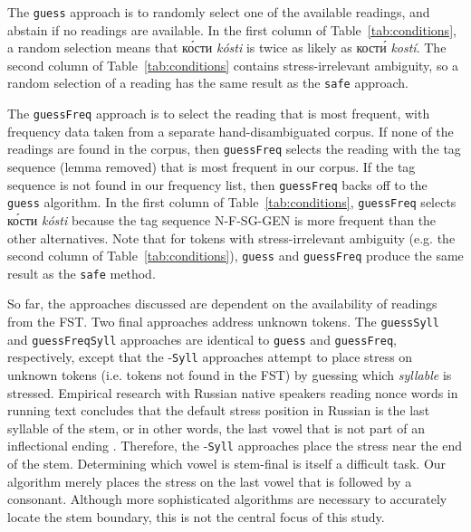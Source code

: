 \documentclass[11pt]{article}
\newcommand{\rus}[1]{\foreignlanguage{russian}{#1}}
\begin{document}
The {\small {\tt guess}} approach is to randomly select one of the available 
readings, and abstain if no readings are available. In the first column of
Table~\ref{tab:conditions}, a random selection means that \rus{к\'{о}сти} 
\emph{k\'{o}sti} is twice as likely as \rus{кост\'{и}} \emph{kost\'{i}}. The
second column of Table~\ref{tab:conditions} contains stress-irrelevant
ambiguity, so a random selection of a reading has the same result as the
{\small {\tt safe}} approach.
 
The {\small {\tt guessFreq}} 
approach is to select the reading that is most frequent, with frequency data
taken from a separate hand-disambiguated corpus. If none of the readings are 
found in the corpus, then {\small {\tt guessFreq}} selects the reading
with the tag sequence (lemma removed) that is most frequent in our corpus. If the 
tag sequence is not found
in our frequency list, then {\small {\tt guessFreq}} backs off to the 
{\small {\tt guess}} algorithm. In the first column of
Table~\ref{tab:conditions}, {\small {\tt guessFreq}} selects \rus{к\'{о}сти} 
\emph{k\'{o}sti} because the tag sequence N-F-SG-GEN is more frequent than the
other alternatives. Note 
that for tokens with stress-irrelevant ambiguity (e.g. the second column of
Table~\ref{tab:conditions}), {\small {\tt guess}} and 
{\small {\tt guessFreq}} produce the same result as the {\small {\tt safe}} 
method.

So far, the approaches discussed are
dependent on the availability of readings from the FST. Two final approaches 
address unknown tokens.
The {\small {\tt guessSyll}} and {\small {\tt guessFreqSyll}} approaches are 
identical to {\small {\tt guess}} and {\small {\tt guessFreq}}, respectively,
except that the -{\small {\tt Syll}} approaches attempt to place stress on
unknown tokens (i.e. tokens not found in the FST) by guessing which 
\emph{syllable} is stressed. Empirical research with
Russian native speakers reading nonce words in running text concludes that
the default stress position in Russian is the last syllable of the stem, or
in other words, the last vowel that is not part of an inflectional ending 
\cite{Crosswhite.ea-03}. Therefore, the -{\small {\tt Syll}} approaches 
place the stress near the end of the stem. Determining 
which vowel is stem-final
is itself a difficult task. Our algorithm merely places the stress on the last 
vowel that is followed by a consonant. Although more sophisticated algorithms
are necessary to accurately locate the stem boundary, this is not the central
focus of this study.
\end{document}
